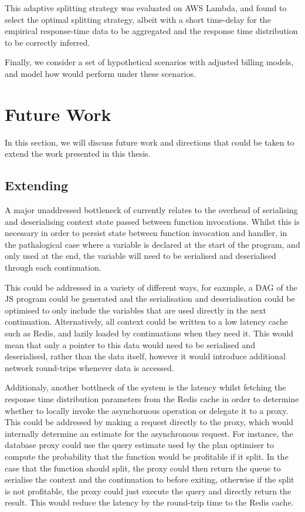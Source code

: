 This adaptive splitting strategy was evaluated on AWS Lambda, and found to select the optimal splitting strategy, albeit with a short time-delay for the empirical response-time data to be aggregated and the response time distribution to be correctly inferred.

Finally, we consider a set of hypothetical scenarios with adjusted \faas{} billing models, and model how \faaas{} would perform under these scenarios.

\section{Future Work}
\label{sec:future-work}
In this section, we will discuss future work and directions that could be taken to extend the work presented in this thesis.

\subsection{Extending \faaasc{}}
A major unaddressed bottleneck of \faaas{} currently relates to the overhead of serialising and deserialising context state passed between function invocations. Whilst this is necessary in order to persist state between function invocation and handler, in the pathalogical case where a variable is declared at the start of the program, and only used at the end, the variable will need to be serialised and deserialised through each continuation.

This could be addressed in a variety of different ways, for eaxmple, a DAG of the JS program could be generated and the serialisation and deserialisation could be optimised to only include the variables that are used directly in the next continuation. Alternatively, all context could be written to a low latency cache such as Redis, and lazily loaded by continuations when they need it. This would mean that only a pointer to this data would need to be serialised and deserialised, rather than the data itself, however it would introduce additional network round-trips whenever data is accessed.

Additionaly, another bottlneck of the system is the latency whilst fetching the response time distribution parameters from the Redis cache in order to determine whether to locally invoke the asynchornous operation or delegate it to a proxy. This could be addressed by making a request directly to the proxy, which would internally determine an estimate for the asynchronous request. For instance, the database proxy could use the query estimate used by the plan optimiser to compute the probability that the function would be profitable if it split. In the case that the function should split, the proxy could then return the queue to serialise the context and the continuation to before exiting, otherwise if the split is not profitable, the proxy could just execute the query and directly return the result. This would reduce the latency by the round-trip time to the Redis cache.


